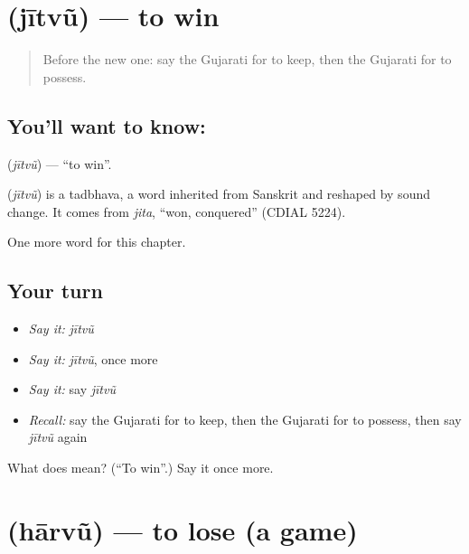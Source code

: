 \section[\texorpdfstring{\gu{જીતવું} (jītvũ)}{જીતવું (jītvũ)}]{ (jītvũ) — to win}

\label{lesson:GU-C105-jitvu}



\begin{quote}
Before the new one: say the Gujarati for to keep, then the Gujarati for to possess.
\end{quote}

\subsection*{You'll want to know: }
\textbf{} (\emph{jītvũ}) — \textquotedblleft{}to win\textquotedblright{}.

\begin{cousinweb}
\textbf{} (\emph{jītvũ}) is a tadbhava, a word inherited from Sanskrit and reshaped by sound change. It comes from \emph{jita}, \textquotedblleft{}won, conquered\textquotedblright{} (CDIAL 5224).
\end{cousinweb}

\begin{grammarlens}[title={What you've built}]
One more word for this chapter.
\end{grammarlens}

\subsection*{Your turn}
\begin{itemize}
\raggedright
  \item \emph{Say it:} \emph{jītvũ}
  \item \emph{Say it:} \emph{jītvũ}, once more
  \item \emph{Say it:} say \emph{jītvũ}
  \item \emph{Recall:} say the Gujarati for to keep, then the Gujarati for to possess, then say \emph{jītvũ} again
\end{itemize}

\begin{tcolorbox}[breakable,colback=teal!4,colframe=teal!35!black,title={Before you move on}]
What does  mean? (\textquotedblleft{}To win\textquotedblright{}.) Say it once more.
\end{tcolorbox}
\section[\texorpdfstring{\gu{હારવું} (hārvũ)}{હારવું (hārvũ)}]{ (hārvũ) — to lose (a game)}

